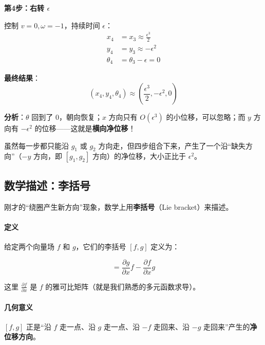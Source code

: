 \textbf{第4步：右转 $\epsilon$}

控制 $v = 0, \omega = -1$，持续时间 $\epsilon$：
\begin{align}
x_4 &= x_3 \approx \frac{\epsilon^3}{2} \\
y_4 &= y_3 \approx -\epsilon^2 \\
\theta_4 &= \theta_3 - \epsilon = 0
\end{align}

\textbf{最终结果}：
\begin{equation}
\boxed{(x_4, y_4, \theta_4) \approx \left(\frac{\epsilon^3}{2}, -\epsilon^2, 0\right)}
\end{equation}

\textbf{分析}：$\theta$ 回到了 0，朝向恢复；$x$ 方向只有 $O(\epsilon^3)$ 的小位移，可以忽略；而 $y$ 方向有 $\boxed{-\epsilon^2}$ 的位移——这就是\textbf{横向净位移}！

虽然每一步都只能沿 $g_1$ 或 $g_2$ 方向走，但四步组合下来，产生了一个沿“缺失方向”（$-y$ 方向，即 $[g_1, g_2]$ 方向）的净位移，大小正比于 $\epsilon^2$。

\subsection*{数学描述：李括号}

刚才的“绕圈产生新方向”现象，数学上用\textbf{李括号}（Lie bracket）来描述。

\paragraph{定义}

给定两个向量场 $f$ 和 $g$，它们的李括号 $[f, g]$ 定义为：

\begin{equation}
[f, g] = \frac{\partial g}{\partial x} f - \frac{\partial f}{\partial x} g
\end{equation}

这里 $\frac{\partial f}{\partial x}$ 是 $f$ 的雅可比矩阵（就是我们熟悉的多元函数求导）。

\paragraph{几何意义}

$[f, g]$ 正是“沿 $f$ 走一点、沿 $g$ 走一点、沿 $-f$ 走回来、沿 $-g$ 走回来”产生的\textbf{净位移方向}。

